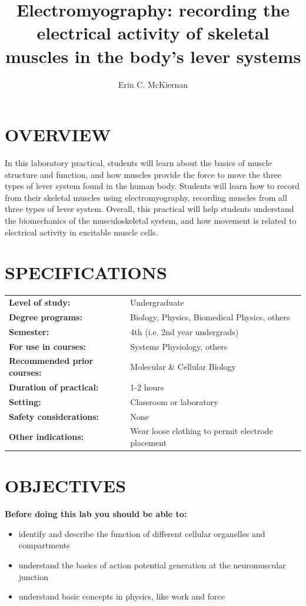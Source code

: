 \documentclass[12pt]{article}
\title{\vspace{-1.8cm}\Large{\textbf{Electromyography: recording the
      electrical activity of skeletal muscles in the body's lever
      systems}}}
\author[1]{Erin C. McKiernan}
\affil[1]{\small{Departamento de F\'isica, Facultad de Ciencias, Universidad Nacional Aut\'onoma de M\'exico}}
\date{}
\begin{document}
\maketitle

\section*{OVERVIEW}
In this laboratory practical, students will learn about the basics of muscle structure and function, and how muscles provide the force to move the three types of lever system found in the human body. Students will learn how to record from their skeletal muscles using electromyography, recording muscles from all three types of lever system. Overall, this practical will help students understand the biomechanics of the musculoskeletal system, and how movement is related to electrical activity in excitable muscle cells.

\section*{SPECIFICATIONS}
\begin{tabular}{p{6cm} p{10cm}}
\textbf{Level of study:} & Undergraduate \\
\textbf{Degree programs:} & Biology, Physics, Biomedical Physics, others \\
\textbf{Semester:} & 4th (i.e. 2nd year undergrads) \\ 
\textbf{For use in courses:} & Systems Physiology, others \\
\textbf{Recommended prior courses:} & Molecular \& Cellular Biology \\
\textbf{Duration of practical:} & 1-2 hours \\
\textbf{Setting:} & Classroom or laboratory \\
\textbf{Safety considerations:} & None \\
\textbf{Other indications:} & Wear loose clothing to permit electrode placement
\end{tabular}

\section*{OBJECTIVES}
\textbf{Before doing this lab you should be able to:}
\begin{itemize}
\item identify and describe the function of different cellular organelles and compartments
\item understand the basics of action potential generation at the neuromuscular junction 
\item understand basic concepts in physics, like work and force 
\end{itemize}
 
\end{document}
